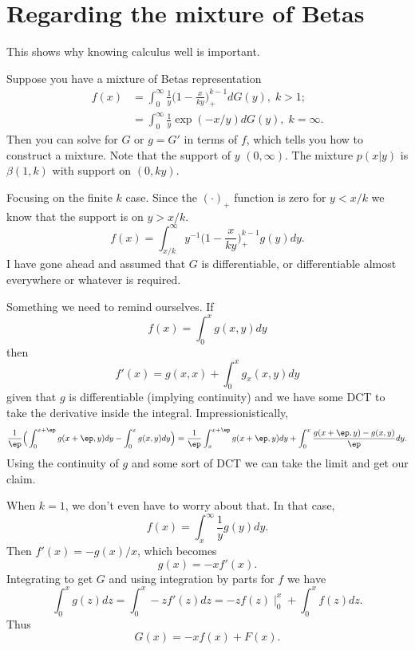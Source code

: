 \documentclass{article}
\begin{document}
\large %

\setcounter{section}{0}

\section{Regarding the mixture of Betas}

This shows why knowing calculus well is important.

Suppose you have a mixture of Betas representation
\begin{align*}
f(x) 
& = \int_0^\infty \frac{1}{y} \Big( 1 - \frac{x}{ky} \Big)^{k-1}_+ dG(y), \; k > 1; \\
& = \int_0^\infty \frac{1}{y} \exp(-x/y) dG(y), \; k = \infty.
\end{align*}
Then you can solve for $G$ or $g = G'$ in terms of $f$, which tells you how to
construct a mixture.  Note that the support of $y$ $(0, \infty)$.  The mixture
$p(x|y)$ is $\beta(1, k)$ with support on $(0, ky)$.

Focusing on the finite $k$ case.  Since the $(\cdot)_+$ function is zero for $y
< x/k$ we know that the support is on $y > x/k$.
\[
f(x) = \int_{x/k}^\infty y^{-1}  \Big( 1 - \frac{x}{ky} \Big)^{k-1}_+ g(y) dy.
\]
I have gone ahead and assumed that $G$ is differentiable, or differentiable
almost everywhere or whatever is required.

Something we need to remind ourselves.  If 
\[
f(x) = \int_0^x g(x,y) dy
\]
then
\[
f'(x) = g(x,x) + \int_0^x g_x(x,y) dy
\]
given that $g$ is differentiable (implying continuity) and we have some DCT to
take the derivative inside the integral.  Impressionistically,
\[
\frac{1}{\ep} \Big( \int_0^{x+\ep} g(x+\ep, y) dy - \int_0^{x} g(x, y) dy \Big)
= \frac{1}{\ep} \int_x^{x+\ep} g(x+\ep, y) dy
+ \int_0^x \frac{g(x+\ep, y) - g(x,y)}{\ep} dy.
\]
Using the continuity of $g$ and some sort of DCT we can take the limit and get
our claim.

When $k=1$, we don't even have to worry about that.  In that case,
\[
f(x) = \int_x^\infty \frac{1}{y} g(y) dy.
\]
Then \( f'(x) = - g(x) / x \), which becomes
\[
g(x) = -x f'(x).
\]
Integrating to get $G$ and using integration by parts for $f$ we have
\[
\int_0^x g(z) dz = \int_0^x -z f'(z) dz = -z f(z) \mid_{0}^x + \int_0^x f(z) dz.
\]
Thus
\[
G(x) = -x f(x) + F(x).
\]
\end{document}
